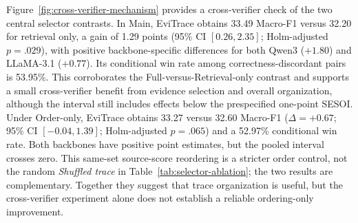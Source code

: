 Figure~\ref{fig:cross-verifier-mechanism} provides a cross-verifier
check of the two central selector contrasts. In Main, EviTrace obtains
33.49 Macro-F1 versus 32.20 for retrieval only, a gain of 1.29 points
(95\% CI $[0.26,2.35]$; Holm-adjusted $p=.029$), with positive
backbone-specific differences for both Qwen3 ($+1.80$) and LLaMA-3.1
($+0.77$). Its conditional win rate among correctness-discordant pairs
is 53.95\%. This corroborates the Full-versus-Retrieval-only contrast
and supports a small cross-verifier benefit from evidence selection and
overall organization, although the interval still includes effects
below the prespecified one-point SESOI. Under Order-only, EviTrace
obtains 33.27 versus 32.60 Macro-F1 ($\Delta=+0.67$; 95\% CI
$[-0.04,1.39]$; Holm-adjusted $p=.065$) and a 52.97\% conditional win
rate. Both backbones have positive point estimates, but the pooled
interval crosses zero. This same-set source-score reordering is a
stricter order control, not the random \emph{Shuffled trace} in
Table~\ref{tab:selector-ablation}; the two results are complementary.
Together they suggest that trace organization is useful, but the
cross-verifier experiment alone does not establish a reliable
ordering-only improvement.
